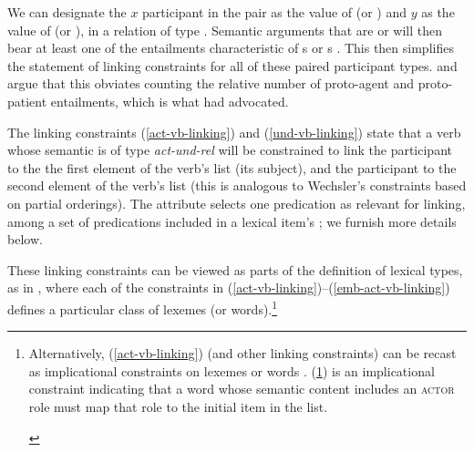 \documentclass[output=paper
 	        ,biblatex
                ,babelshorthands
                ,newtxmath
                ,draftmode
                ,colorlinks, citecolor=brown
]{langscibook}
\begin{document}
\noindent
We can designate the $x$ participant in the pair as the value of  (or ) and
$y$ as the value of  (or ), in a relation of type .
Semantic arguments that are  or  will then bear at least one of the
entailments characteristic of s or s
\citep[72]{DavisandKoenig2000b}. This then simplifies the statement of linking constraints for all
of these paired participant types.  \citet{Davis1996} and \citet{KoenigandDavis2001} argue that this
obviates counting the relative number of proto-agent and proto-patient entailments, which is what
\citet{Dowty1991} had advocated.

The linking constraints (\ref{act-vb-linking}) and (\ref{und-vb-linking}) state that 
a verb whose semantic \content is of type \emph{act-und-rel} will be constrained to link the
 participant to the the first element of the verb's \argst list (its subject), and the
 participant to the second element of the verb's \argst list (this is analogous to
Wechsler's constraints based on partial orderings).  The attribute  selects
one predication as relevant for linking, among a set of predications included in a lexical item's
; we furnish more details below. 

These linking constraints can be viewed as parts of the definition of lexical types, as in
\citet{Davis2001}, where each of the constraints in
(\ref{act-vb-linking})--(\ref{emb-act-vb-linking}) defines a particular class of lexemes (or
words).\footnote{Alternatively, (\ref{act-vb-linking}) (and other linking constraints) can be recast
  as implicational constraints on lexemes or words \citep{KoenigandDavis2003}.
  (\ref{act-vb-linking-alt}) is an implicational constraint indicating that a word whose semantic
  content includes an \textsc{actor} role must map that role to the initial item in the \argst list.

\begin{exe}
\ex\label{act-vb-linking-alt}
 \impl {}
\end{exe} 
}   

\begin{exe}
	\ex\label{act-vb-linking}
\end{exe}
\end{document}
